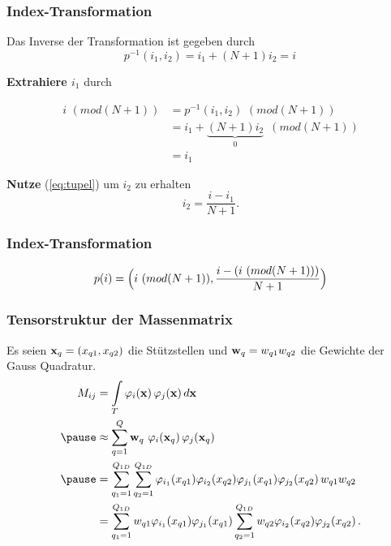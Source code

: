 \begin{frame}
\frametitle{Index-Transformation}
Das Inverse der Transformation ist gegeben durch
\begin{equation} \label{eq:tupel}
p^{-1}(i_1,i_2) = i_1 + (N+1)i_2 = i \, 
\end{equation}

\textbf{Extrahiere $i_1$} durch

\begin{equation*}
\begin{aligned}
i \, \, (mod (N+1)) &=p^{-1}(i_1,i_2) \, \, (mod (N+1)) \\ &= i_1 + \underbrace{(N+1)i_2}_{0} \, \, \, (mod (N+1)) \\ &= i_1
\end{aligned}
\end{equation*}

\textbf{Nutze} (\ref{eq:tupel}) um $i_2$ zu erhalten
\begin{equation*} \label{eq:tupel2}
 i_2 = \dfrac{ i - i_1 } {N+1}.
\end{equation*}
\end{frame}

\begin{frame}
\frametitle{Index-Transformation}
\begin{framed}
\begin{equation*} \label{eq:p}
p(i)= \Big{(} i \, \, (mod (N+1)),  \dfrac{ i -  (i \, \, (mod (N+1))) } {N+1} \Big{)}
\end{equation*}
\end{framed}
\end{frame}

\begin{frame}
\frametitle{Tensorstruktur der Massenmatrix}
Es seien $\bold{x}_q=(x_{q1},x_{q2})$ die Stützstellen und $\bold{w}_q=w_{q1}w_{q2}$ die Gewichte der Gauss Quadratur.
\begin{equation*} \label{eq:massapprox}
\begin{aligned}
M_{ij} &= \int\limits_{T} \varphi_i (\bold{x}) \, \varphi_j (\bold{x}) \, d\bold{x} \\ \pause
&\approx  \sum\limits_{q=1}^Q \bold{w}_q \, \, \varphi_i (\bold{x}_q) \, \varphi_j (\bold{x}_q) \\ \pause
&= \sum\limits_{q_1=1}^{Q_{1D}} \sum\limits_{q_2=1}^{Q_{1D}} \varphi_{i_1}(x_{q1}) \varphi_{i_2}(x_{q2}) \varphi_{j_1}(x_{q1}) \varphi_{j_2}(x_{q2}) \, w_{q1} w_{q2} \\ 
&= \sum\limits_{q_1=1}^{Q_{1D}} w_{q1} \varphi_{i_1}(x_{q1}) \varphi_{j_1}(x_{q1}) \sum\limits_{q_2=1}^{Q_{1D}} w_{q2} \varphi_{i_2}(x_{q2}) \varphi_{j_2}(x_{q2}) \, . 
\end{aligned}
\end{equation*}
\end{frame}

